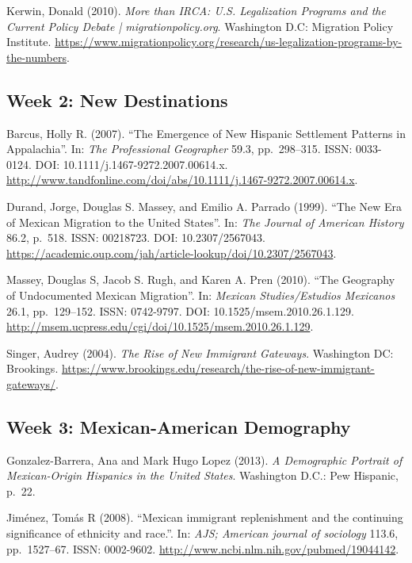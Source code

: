 \documentclass[11pt,]{article}
\begin{document}
Kerwin, Donald (2010).
\emph{More than IRCA: U.S. Legalization Programs and the Current Policy Debate | migrationpolicy.org}.
Washington D.C: Migration Policy Institute.
\url{https://www.migrationpolicy.org/research/us-legalization-programs-by-the-numbers}.

\hypertarget{week-2-new-destinations}{%
\subsection{Week 2: New Destinations}\label{week-2-new-destinations}}

Barcus, Holly R. (2007). ``The Emergence of New Hispanic Settlement
Patterns in Appalachia''. In: \emph{The Professional Geographer} 59.3,
pp.~298--315. ISSN: 0033-0124. DOI: 10.1111/j.1467-9272.2007.00614.x.
\url{http://www.tandfonline.com/doi/abs/10.1111/j.1467-9272.2007.00614.x}.

Durand, Jorge, Douglas S. Massey, and Emilio A. Parrado (1999). ``The
New Era of Mexican Migration to the United States''. In:
\emph{The Journal of American History} 86.2, p.~518. ISSN: 00218723.
DOI: 10.2307/2567043.
\url{https://academic.oup.com/jah/article-lookup/doi/10.2307/2567043}.

Massey, Douglas S, Jacob S. Rugh, and Karen A. Pren (2010). ``The
Geography of Undocumented Mexican Migration''. In:
\emph{Mexican Studies/Estudios Mexicanos} 26.1, pp.~129--152. ISSN:
0742-9797. DOI: 10.1525/msem.2010.26.1.129.
\url{http://msem.ucpress.edu/cgi/doi/10.1525/msem.2010.26.1.129}.

Singer, Audrey (2004). \emph{The Rise of New Immigrant Gateways}.
Washington DC: Brookings.
\url{https://www.brookings.edu/research/the-rise-of-new-immigrant-gateways/}.

\hypertarget{week-3-mexican-american-demography}{%
\subsection{Week 3: Mexican-American
Demography}\label{week-3-mexican-american-demography}}

Gonzalez-Barrera, Ana and Mark Hugo Lopez (2013).
\emph{A Demographic Portrait of Mexican-Origin Hispanics in the United States}.
Washington D.C.: Pew Hispanic, p.~22.

Jiménez, Tomás R (2008). ``Mexican immigrant replenishment and the
continuing significance of ethnicity and race.''. In:
\emph{AJS; American journal of sociology} 113.6, pp.~1527--67. ISSN:
0002-9602. \url{http://www.ncbi.nlm.nih.gov/pubmed/19044142}.
\end{document}

